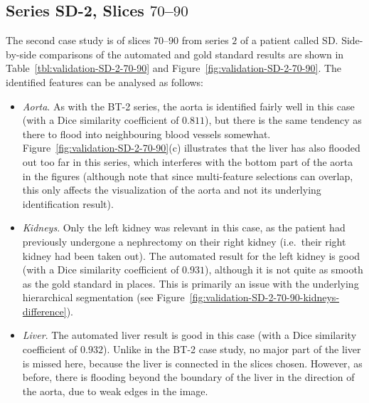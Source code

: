 \afterpage{\clearpage}
\newpage

\subsection{Series SD-2, Slices $70$--$90$}

The second case study is of slices $70$--$90$ from series $2$ of a patient called SD. Side-by-side comparisons of the automated and gold standard results are shown in Table~\ref{tbl:validation-SD-2-70-90} and Figure~\ref{fig:validation-SD-2-70-90}. The identified features can be analysed as follows:
%
\begin{itemize}

\item \emph{Aorta}. As with the BT-2 series, the aorta is identified fairly well in this case (with a Dice similarity coefficient of $0.811$), but there is the same tendency as there to flood into neighbouring blood vessels somewhat. Figure~\ref{fig:validation-SD-2-70-90}(c) illustrates that the liver has also flooded out too far in this series, which interferes with the bottom part of the aorta in the figures (although note that since multi-feature selections can overlap, this only affects the visualization of the aorta and not its underlying identification result).

\item \emph{Kidneys}. Only the left kidney was relevant in this case, as the patient had previously undergone a nephrectomy on their right kidney (i.e.~their right kidney had been taken out). The automated result for the left kidney is good (with a Dice similarity coefficient of $0.931$), although it is not quite as smooth as the gold standard in places. This is primarily an issue with the underlying hierarchical segmentation (see Figure~\ref{fig:validation-SD-2-70-90-kidneys-difference}).

\item \emph{Liver}. The automated liver result is good in this case (with a Dice similarity coefficient of $0.932$). Unlike in the BT-2 case study, no major part of the liver is missed here, because the liver is connected in the slices chosen. However, as before, there is flooding beyond the boundary of the liver in the direction of the aorta, due to weak edges in the image.


\end{itemize}
